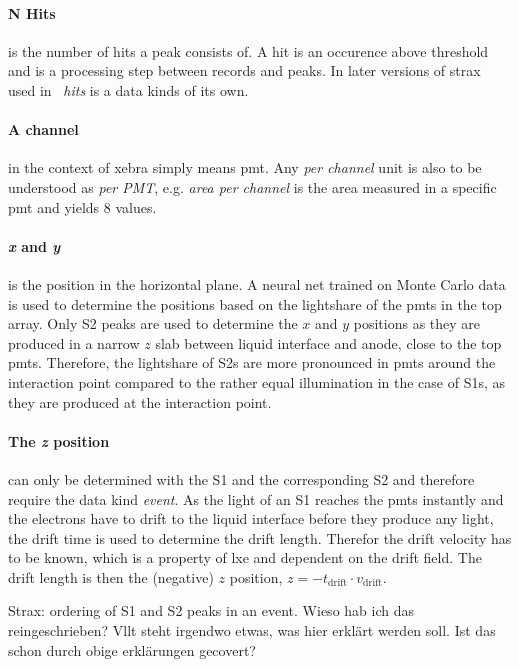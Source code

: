 \paragraph{N Hits} is the number of hits a peak consists of.
A hit is an occurence above threshold and is a processing step between records and peaks.
In later versions of strax used in \nton~\emph{hits} is a data kinds of its own.

\paragraph{A channel} in the context of \gls{xebra} simply means \gls{pmt}.
Any \emph{per channel} unit is also to be understood as \emph{per PMT}, e.g. \emph{area per channel} is the area measured in a specific \gls{pmt} and yields 8 values.

\paragraph{\emph{x} and \emph{y}} is the position in the horizontal plane.
A neural net trained on Monte Carlo data is used to determine the positions based on the lightshare of the \glspl{pmt} in the top array.  %
Only S2 peaks are used to determine the $ x $ and $ y $ positions as they are produced in a narrow $ z $ slab between liquid interface and anode, close to the top \glspl{pmt}.
Therefore, the lightshare of S2s are more pronounced in \glspl{pmt} around the interaction point compared to the rather equal illumination in the case of S1s, as they are produced at the interaction point.


\paragraph{The \emph{z} position} can only be determined with the S1 and the corresponding S2 and therefore require the data kind \emph{event}.
As the light of an S1 reaches the \glspl{pmt} instantly and the electrons have to drift to the liquid interface before they produce any light, the drift time is used to determine the drift length.
Therefor the drift velocity has to be known, which is a property of \gls{lxe} and dependent on the drift field.
The drift length is then the (negative) $ z $ position, $ z = -t_\mathrm{drift} \cdot v_\mathrm{drift}  $.





Strax: ordering of S1 and S2 peaks in an event. Wieso hab ich das reingeschrieben? Vllt steht irgendwo etwas, was hier erklärt werden soll. Ist das schon durch obige erklärungen gecovert?
